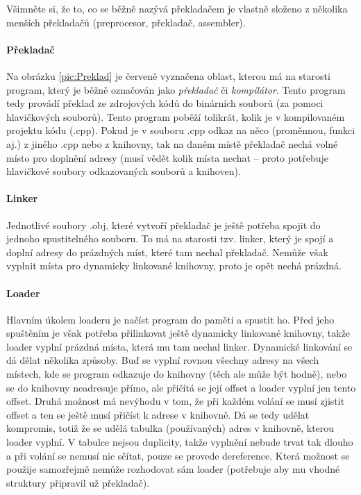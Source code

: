 Všimněte si, že to, co se běžně nazývá překladačem je vlastně složeno z několika menších překladačů (preprocesor, překladač, assembler).

\paragraph{Překladač}
Na obrázku \ref{pic:Preklad} je červeně vyznačena oblast, kterou má na starosti program, který je běžně označován jako \emph{překladač} či \emph{kompilátor}. Tento program tedy provádí překlad ze zdrojových kódů do binárních souborů (za pomoci hlavičkových souborů). Tento program poběží tolikrát, kolik je v kompilovaném projektu kódu (.cpp). Pokud je v souboru .cpp odkaz na něco (proměnnou, funkci aj.) z jiného .cpp nebo z knihovny, tak na daném místě překladač nechá volné místo pro doplnění adresy (musí vědět kolik místa nechat -- proto potřebuje hlavičkové soubory odkazovaných souborů a knihoven).

\paragraph{Linker}
Jednotlivé soubory .obj, které vytvoří překladač je ještě potřeba spojit do jednoho spustitelného souboru. To má na starosti tzv. linker, který je spojí a doplní adresy do prázdných míst, které tam nechal překladač. Nemůže však vyplnit místa pro dynamicky linkované knihovny, proto je opět nechá prázdná.

\paragraph{Loader}
Hlavním úkolem loaderu je načíst program do paměti a spustit ho. Před jeho spuštěním je však potřeba přilinkovat ještě dynamicky linkované knihovny, takže loader vyplní prázdná místa, která mu tam nechal linker. Dynamické linkování se dá dělat několika způsoby. Buď se vyplní rovnou všechny adresy na všech místech, kde se program odkazuje do knihovny (těch ale může být hodně), nebo se do knihovny neadresuje přímo, ale přičítá se její offset a loader vyplní jen tento offset. Druhá možnost má nevýhodu v tom, že při každém volání se musí zjistit offset a ten se ještě musí přičíst k adrese v knihovně. Dá se tedy udělat kompromis, totiž že se udělá tabulka (používaných) adres v knihovně, kterou loader vyplní. V tabulce nejsou duplicity, takže vyplnění nebude trvat tak dlouho a při volání se nemusí nic sčítat, pouze se provede dereference. Která možnost se použije samozřejmě nemůže rozhodovat sám loader (potřebuje aby mu vhodné struktury připravil už překladač).

